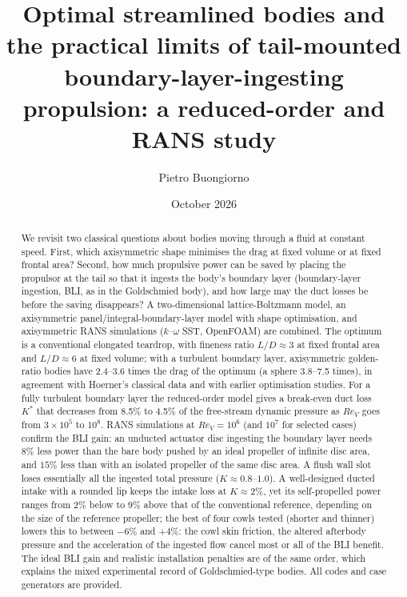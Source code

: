 \documentclass[11pt,a4paper]{article}
\title{Optimal streamlined bodies and the practical limits of tail-mounted
boundary-layer-ingesting propulsion: a reduced-order and RANS study}
\author{Pietro Buongiorno}
\date{October 2026}
\newcommand{\ReV}{\mathit{Re}_V}
\begin{document}
\maketitle

\begin{abstract}
We revisit two classical questions about bodies moving through a fluid at constant speed.
First, which axisymmetric shape minimises the drag at fixed volume or at fixed frontal area?
Second, how much propulsive power can be saved by placing the propulsor at the tail so that
it ingests the body's boundary layer (boundary-layer ingestion, BLI, as in the Goldschmied
body), and how large may the duct losses be before the saving disappears?
A two-dimensional lattice-Boltzmann model, an axisymmetric panel/integral-boundary-layer model
with shape optimisation, and axisymmetric RANS simulations ($k$--$\omega$ SST, OpenFOAM) are
combined. The optimum is a conventional elongated teardrop, with fineness ratio $L/D\approx3$
at fixed frontal area and $L/D\approx6$ at fixed volume; with a turbulent boundary layer,
axisymmetric golden-ratio bodies have 2.4--3.6 times the drag of the optimum (a sphere 3.8--7.5
times), in agreement with Hoerner's classical data and with earlier optimisation studies.
For a fully turbulent boundary layer the reduced-order model gives a break-even duct loss
$K^*$ that decreases from 8.5\% to 4.5\% of the free-stream dynamic pressure as $\ReV$ goes
from $3\times10^5$ to $10^8$. RANS simulations at $\ReV=10^6$ (and $10^7$ for selected cases) confirm the BLI gain: an
unducted actuator disc ingesting the boundary layer needs $8\%$ less power than the bare
body pushed by an ideal propeller of infinite disc area, and $15\%$ less than with an
isolated propeller of the same disc area. A flush wall slot loses essentially all the
ingested total pressure ($K\approx0.8$--$1.0$). A well-designed ducted intake with a rounded
lip keeps the intake loss at $K\approx2\%$, yet its self-propelled power ranges from $2\%$
below to $9\%$ above that of the conventional reference, depending on the size of the
reference propeller; the best of four cowls tested (shorter and thinner) lowers this to
between $-6\%$ and $+4\%$: the cowl skin friction, the altered afterbody pressure and the
acceleration of the ingested flow cancel most or all of the BLI benefit. The ideal BLI gain
and realistic installation penalties are of the same order, which explains the mixed
experimental record of Goldschmied-type bodies.
All codes and case generators are provided.
\end{abstract}
\end{document}
